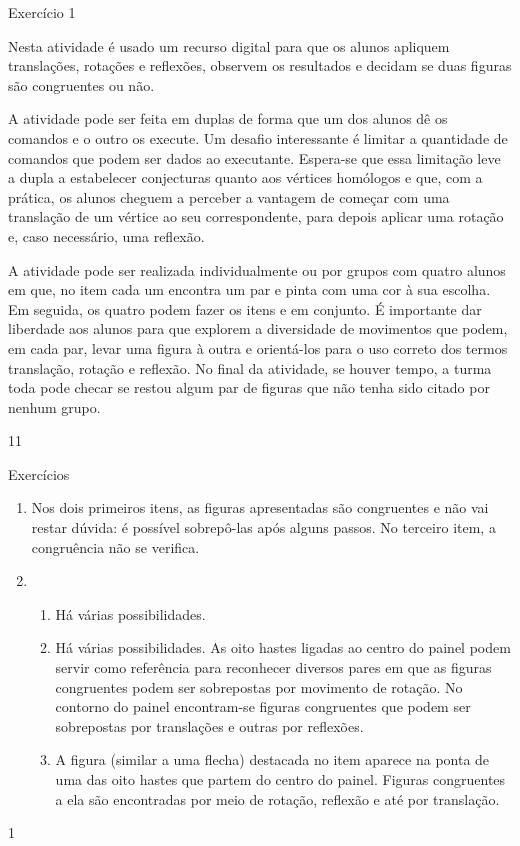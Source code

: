 \clearpage
\def\currentcolor{cor1}
\begin{sugestions}{Exercício 1}
{
Nesta atividade é usado um recurso digital para que os alunos apliquem translações, rotações e reflexões, observem os resultados e decidam se duas figuras são congruentes ou não.

A atividade pode ser feita em duplas de forma que um dos alunos dê os comandos e o outro os execute. Um desafio interessante é limitar a quantidade de comandos que podem ser dados ao executante. Espera-se que essa limitação leve a dupla a estabelecer conjecturas quanto aos vértices homólogos e que, com a prática, os alunos cheguem a perceber a vantagem de começar com uma translação de um vértice ao seu correspondente, para depois aplicar uma rotação e, caso necessário, uma reflexão.


A atividade pode ser realizada individualmente ou por grupos com quatro alunos em que, no item  cada um encontra um par e pinta com uma cor à sua escolha. Em seguida, os quatro podem fazer os itens  e  em conjunto. É importante dar liberdade aos alunos para que explorem a diversidade de movimentos que podem, em cada par, levar uma figura à outra e orientá-los para o uso correto dos termos translação, rotação e reflexão. No final da atividade, se houver tempo, a turma toda pode checar se restou algum par de figuras que não tenha sido citado por nenhum grupo.
}{1}{1}
\end{sugestions}
\begin{answer}{Exercícios}
{
\exerciselist
\begin{enumerate}
\item Nos dois primeiros itens, as figuras apresentadas são congruentes e não vai restar dúvida: é possível sobrepô-las após alguns passos. No terceiro item, a congruência não se verifica.
\item 
\begin{enumerate}
\item Há várias possibilidades. 
\item Há várias possibilidades. As oito hastes ligadas ao centro do painel podem servir como referência para reconhecer diversos pares em que as figuras congruentes podem ser sobrepostas por movimento de rotação. No contorno do painel encontram-se figuras congruentes que podem ser sobrepostas por translações e outras por reflexões. 
\item A figura (similar a uma flecha) destacada no item aparece na ponta de uma das oito hastes que partem do centro do painel. Figuras congruentes a ela são encontradas por meio de rotação, reflexão e até por translação. 
\end{enumerate}
\end{enumerate}
}{1}
\end{answer}
